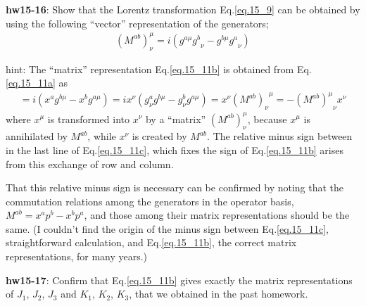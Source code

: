 \documentclass[12pt]{article}
\begin{document}
{{\bf hw15-16}: Show that the Lorentz transformation Eq.\ref{eq.15_9} can be obtained by using the following ``vector'' representation of the generators;
\begin{eqnarray}
  (M^{ab})^\mu_\nu = i ( g^{a\mu} {g^b}_\nu - g^{b\mu} {g^a}_\nu )\label{eq.15_11b}
\end{eqnarray}

hint: The ``matrix'' representation Eq.\ref{eq.15_11b} is obtained from Eq.\ref{eq.15_11a} as
\begin{eqnarray}
  [M^{ab}, x^\mu] = i ( x^a g^{b\mu} - x^b g^{a\mu} )
                     = i x^\nu ( g^a_\nu g^{b\mu} - g^b_\nu g^{a\mu} )
                     = x^\nu {(M^{ab})_\nu}^\mu
                     = -{(M^{ab})^\mu}_\nu x^\nu \label{eq.15_11c}
\end{eqnarray}
  where $x^\mu$ is transformed into $x^\nu$ by a ``matrix'' $(M^{ab})_\nu^\mu$,
  because $x^\mu$ is annihilated by $M^{ab}$, while $x^\nu$ is created by $M^{ab}$. The relative minus sign between in the last line of Eq.\ref{eq.15_11c}, which fixes the sign of Eq.\ref{eq.15_11b} arises from this exchange of row and column.

  That this relative minus sign is necessary can be confirmed by noting
  that the commutation relations among the generators in the operator
  basis, $M^{ab} = x^a p^b - x^b p^a$, and those among their matrix
  representations should be the same.  (I couldn't find the origin of
  the minus sign between Eq.\ref{eq.15_11c}, straightforward calculation, and Eq.\ref{eq.15_11b},
  the correct matrix representations, for many years.)


{\bf hw15-17}: Confirm that Eq.\ref{eq.15_11b} gives exactly the matrix representations of $J_1$, $J_2$, $J_3$ and $K_1$, $K_2$, $K_3$, that we obtained in the past homework.

}
\end{document}
